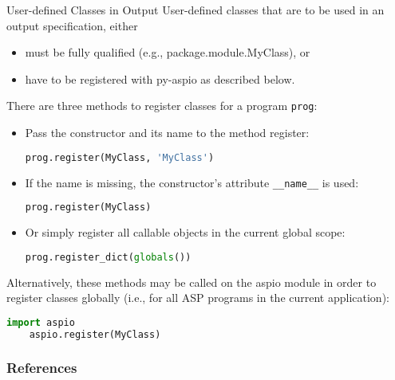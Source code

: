 \documentclass[%
beamer,%
english,%
10pt,%
]{beamer}
\newcommand{\blue}[1]{{\color{blue}#1}}
\begin{document}
\begin{frame}[fragile]{User-defined Classes in Output}
    User-defined classes that are to be used in an output specification, either
    \begin{itemize}
        \item must be fully qualified (e.g., \blue{package.module.MyClass}), or
        \item have to be \blue{registered with py-aspio} as described below.
    \end{itemize}

    \medskip
    There are three methods to register classes for a program \lstinline{prog}:
    \begin{itemize}
        \item
            Pass the constructor and its name to the method \blue{register}:
            \begin{lstlisting}[basicstyle=\footnotesize,language=python,autogobble]
            prog.register(MyClass, 'MyClass')
            \end{lstlisting}
        \item
            If the name is missing, the constructor's attribute \blue{\lstinline{__name__}} is used:
            \begin{lstlisting}[basicstyle=\footnotesize,language=python,autogobble]
            prog.register(MyClass)
            \end{lstlisting}
        \item
            Or simply register all callable objects in the current global scope:
            \begin{lstlisting}[basicstyle=\footnotesize,language=python,autogobble]
            prog.register_dict(globals())
            \end{lstlisting}
    \end{itemize}

    \medskip
    Alternatively, these methods may be called on the \blue{aspio} module
    in order to register classes globally (i.e., for all ASP programs in the current application):
    \begin{lstlisting}[basicstyle=\footnotesize,language=python,autogobble]
    import aspio
    aspio.register(MyClass)
    \end{lstlisting}
\end{frame}

\begin{frame}[allowframebreaks]
    \frametitle{References}

    \footnotesize
    
    
\end{frame}
\end{document}
